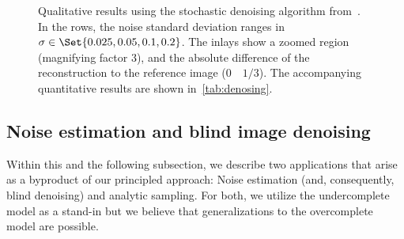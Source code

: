 \begin{figure}
	\centering
	\caption[Qualitative results for stochastic denoising]{%
		Qualitative results using the stochastic denoising algorithm from~\cite{kawar_stochastic_2021}.
		In the rows, the noise standard deviation ranges in \( \sigma \in \Set{ \num{0.025}, \num{0.05}, \num{0.1}, \num{0.2}} \).
		The inlays show a zoomed region (magnifying factor \num{3}), and the absolute difference of the reconstruction to the reference image (\num{0}~\protect\drawcolorbar~\(\num{1}/\num{3}\)).
		The accompanying quantitative results are shown in~\cref{tab:denosing}.
	}%
	\label{fig:denoising stochastic}
\end{figure}

\subsection{Noise estimation and blind image denoising}
Within this and the following subsection, we describe two applications that arise as a byproduct of our principled approach:
Noise estimation (and, consequently, blind denoising) and analytic sampling.
For both, we utilize the undercomplete model as a stand-in but we believe that generalizations to the overcomplete model are possible.


